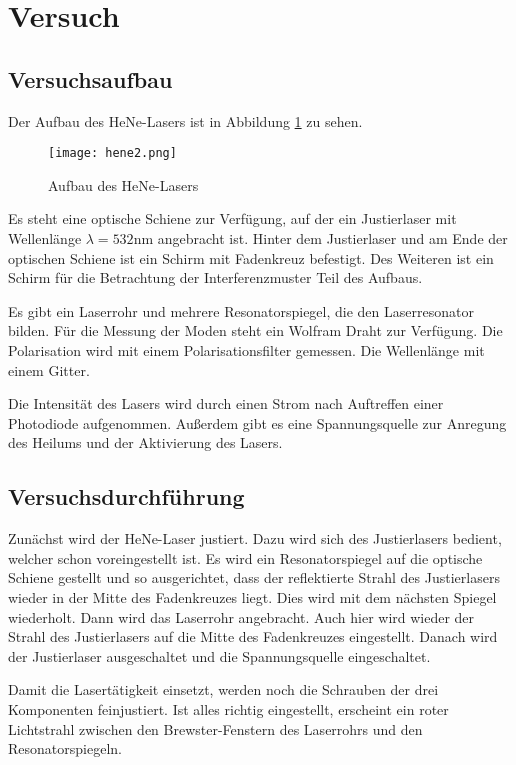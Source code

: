 \section{Versuch}
\subsection{Versuchsaufbau}
Der Aufbau des HeNe-Lasers ist in Abbildung \ref{fig:hene2} zu sehen.

\begin{figure}
	\centering
		\texttt{[image: hene2.png]}
	\caption{Aufbau des HeNe-Lasers}
	\label{fig:hene2}
\end{figure}

\noindent Es steht eine optische Schiene zur Verfügung, auf der ein Justierlaser mit Wellenlänge \(\lambda=532\)nm angebracht ist. Hinter dem Justierlaser und am Ende der optischen Schiene ist ein Schirm mit Fadenkreuz befestigt. Des Weiteren ist ein Schirm für die Betrachtung der Interferenzmuster Teil des Aufbaus.

\noindent Es gibt ein Laserrohr und mehrere Resonatorspiegel, die den Laserresonator bilden. Für die Messung der Moden steht ein Wolfram Draht zur Verfügung. Die Polarisation wird mit einem Polarisationsfilter gemessen. Die Wellenlänge mit einem Gitter.

\noindent Die Intensität des Lasers wird durch einen Strom nach Auftreffen einer Photodiode aufgenommen. Außerdem gibt es eine Spannungsquelle zur Anregung des Heilums und der Aktivierung des Lasers.

\subsection{Versuchsdurchführung}
Zunächst wird der HeNe-Laser justiert. Dazu wird sich des Justierlasers bedient, welcher schon voreingestellt ist. Es wird ein Resonatorspiegel auf die optische Schiene gestellt und so ausgerichtet, dass der reflektierte Strahl des Justierlasers wieder in der Mitte des Fadenkreuzes liegt. Dies wird mit dem nächsten Spiegel wiederholt. Dann wird das Laserrohr angebracht. Auch hier wird wieder der Strahl des Justierlasers auf die Mitte des Fadenkreuzes eingestellt. Danach wird der Justierlaser ausgeschaltet und die Spannungsquelle eingeschaltet.

\noindent Damit die Lasertätigkeit einsetzt, werden noch die Schrauben der drei Komponenten feinjustiert. Ist alles richtig eingestellt, erscheint ein roter Lichtstrahl zwischen den Brewster-Fenstern des Laserrohrs und den Resonatorspiegeln.

